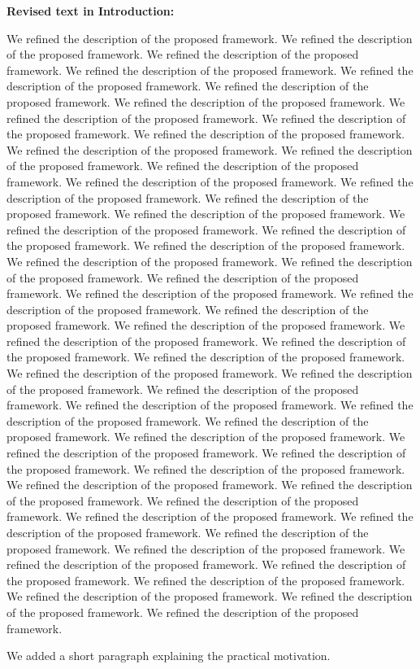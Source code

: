 \documentclass[11pt]{article}
\newcommand{\labelfont}{\sffamily}
\newcommand{\modified}[1]{{\color{modblue}#1}}
\newcommand{\added}[1]{{\color{addred}#1}}
\newcommand{\responsebodyformat}{%
  \setstretch{1.03}%
  \setlength{\parindent}{0pt}%
  \setlength{\parskip}{0.42em}%
}
\newenvironment{revisionblock}
{
  \par\vspace{0.45em}
  \vspace{0.18em}%
  \begin{revisionblockbody}
  \responsebodyformat
}
{
  \end{revisionblockbody}
  \vspace{0.10em}
}
\begin{document}
\begin{revisionblock}
\textbf{Revised text in Introduction:}

\modified{We refined the description of the proposed framework. We refined the description of the proposed framework. We refined the description of the proposed framework. We refined the description of the proposed framework. We refined the description of the proposed framework. We refined the description of the proposed framework. We refined the description of the proposed framework. We refined the description of the proposed framework. We refined the description of the proposed framework. We refined the description of the proposed framework. We refined the description of the proposed framework. We refined the description of the proposed framework. We refined the description of the proposed framework. We refined the description of the proposed framework. We refined the description of the proposed framework. We refined the description of the proposed framework. We refined the description of the proposed framework. We refined the description of the proposed framework. We refined the description of the proposed framework. We refined the description of the proposed framework. We refined the description of the proposed framework. We refined the description of the proposed framework. We refined the description of the proposed framework. We refined the description of the proposed framework. We refined the description of the proposed framework. We refined the description of the proposed framework. We refined the description of the proposed framework. We refined the description of the proposed framework. We refined the description of the proposed framework. We refined the description of the proposed framework. We refined the description of the proposed framework. We refined the description of the proposed framework. We refined the description of the proposed framework. We refined the description of the proposed framework. We refined the description of the proposed framework. We refined the description of the proposed framework. We refined the description of the proposed framework. We refined the description of the proposed framework. We refined the description of the proposed framework. We refined the description of the proposed framework. We refined the description of the proposed framework. We refined the description of the proposed framework. We refined the description of the proposed framework. We refined the description of the proposed framework. We refined the description of the proposed framework. We refined the description of the proposed framework. We refined the description of the proposed framework. We refined the description of the proposed framework. We refined the description of the proposed framework. We refined the description of the proposed framework. We refined the description of the proposed framework. We refined the description of the proposed framework. We refined the description of the proposed framework.}

\added{We added a short paragraph explaining the practical motivation.}
\end{revisionblock}
\end{document}
